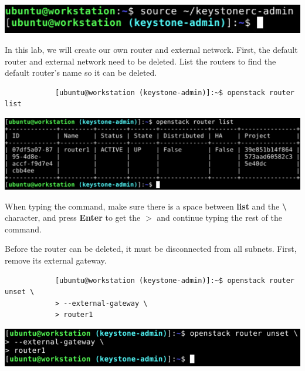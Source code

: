 \documentclass[letterpaper, 12pt]{article}
\begin{document}
\begin{enumerate}
\begin{labstep}
        \begin{center}
            \includegraphics[width=\linewidth]{images/part1/step3.png}
        \end{center}
    \end{labstep}

    \begin{labstep}
        In this lab, we will create our own router and external network.
        First, the default router and external network need to be deleted.
        List the routers to find the default router's name so it can be deleted.
        \begin{lstlisting}
            [ubuntu@workstation (keystone-admin)]:~$ openstack router list
        \end{lstlisting}

        \begin{center}
            \includegraphics[width=\linewidth]{images/part1/step4.png}
        \end{center}
    \end{labstep}

    \begin{tipbox}
        When typing the command, make sure there is a space between \textbf{list} and the \textbf{\textbackslash} character, and press \textbf{Enter} to get the \textbf{$>$} and continue typing the rest of the command.
    \end{tipbox}

    \begin{labstep}
        Before the router can be deleted, it must be disconnected from all subnets.
        First, remove its external gateway.
        \begin{lstlisting}
            [ubuntu@workstation (keystone-admin)]:~$ openstack router unset \
            > --external-gateway \
            > router1
        \end{lstlisting}

        \begin{center}
            \includegraphics[width=\linewidth]{images/part1/step5.png}
        \end{center}
    \end{labstep}


\end{enumerate}
\end{document}
